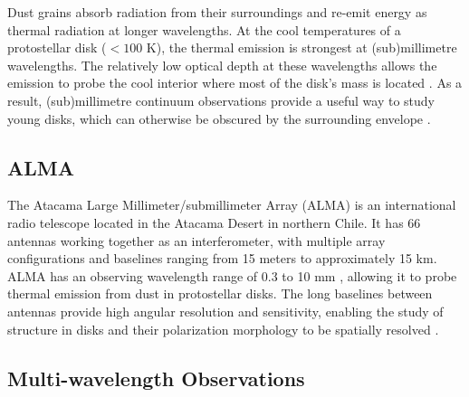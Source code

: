 



Dust grains absorb radiation from their surroundings and re-emit energy as thermal radiation at longer wavelengths. At the cool temperatures of a protostellar disk ($<100$ K), the thermal emission is strongest at (sub)millimetre wavelengths. The relatively low optical depth at these wavelengths allows the emission to probe the cool interior where most of the disk's mass is located \citep{Birnstiel2016, Andrews, Shirley}. As a result, (sub)millimetre continuum observations provide a useful way to study young disks, which can otherwise be obscured by the surrounding envelope \citep{Andrews}.







\subsection{ALMA}
The Atacama Large Millimeter/submillimeter Array
(ALMA) is an international radio telescope located in the Atacama Desert in northern Chile. It has 66 antennas working together as an interferometer, with multiple array configurations and baselines ranging from 15 meters to approximately 15 km. ALMA has an observing wavelength range of 0.3 to 10 mm \citep{Wotten}, allowing it to probe thermal emission from dust in protostellar disks. The long baselines between antennas provide high angular resolution and sensitivity, enabling the study of structure in disks and their polarization morphology to be spatially resolved \citep{Testi}. 

 








\subsection{Multi-wavelength Observations}
\label{sec: intro_mw}


